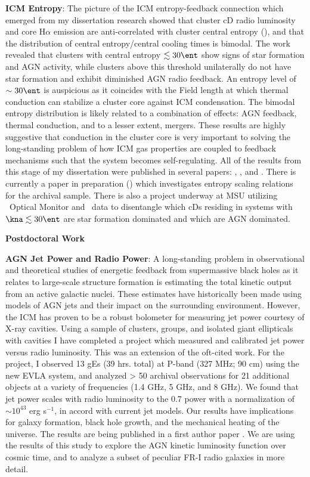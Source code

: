 \documentclass[12pt]{article}
\begin{document}
{\bfseries{ICM Entropy}}: The picture of the ICM entropy-feedback
connection which emerged from my dissertation research showed that
cluster cD radio luminosity and core H$\alpha$ emission are
anti-correlated with cluster central entropy (\kna), and that the
distribution of central entropy/central cooling times is bimodal. The
work revealed that clusters with central entropy $\lesssim 30 \ent$
show signs of star formation and AGN activity, while clusters above
this threshold unilaterally do not have star formation and exhibit
diminished AGN radio feedback. An entropy level of $\sim 30 \ent$ is
auspicious as it coincides with the Field length at which thermal
conduction can stabilize a cluster core against ICM condensation. The
bimodal entropy distribution is likely related to a combination of
effects: AGN feedback, thermal conduction, and to a lesser extent,
mergers. These results are highly suggestive that conduction in the
cluster core is very important to solving the long-standing problem of
how ICM gas properties are coupled to feedback mechanisms such that
the system becomes self-regulating. All of the results from this stage
of my dissertation were published in several papers: \cite{accept},
\cite{haradent}, and \cite{conduction}. There is currently a paper in
preparation (\cite{entscale}) which investigates entropy scaling
relations for the archival sample. There is also a project underway at
MSU utilizing \xmm\ Optical Monitor and \spitzer\ data to disentangle
which cDs residing in systems with $\kna \lesssim 30 \ent$ are star
formation dominated and which are AGN dominated.

{\bfseries{Postdoctoral Work}}

{\bfseries{AGN Jet Power and Radio Power}}: A long-standing problem in
observational and theoretical studies of energetic feedback from
supermassive black holes as it relates to large-scale structure
formation is estimating the total kinetic output from an active
galactic nuclei. These estimates have historically been made using
models of AGN jets and their impact on the surrounding
environment. However, the ICM has proven to be a robust bolometer for
measuring jet power courtesy of X-ray cavities. Using a sample of
clusters, groups, and isolated giant ellipticals with cavities I have
completed a project which measured and calibrated jet power versus
radio luminosity. This was an extension of the oft-cited
\cite{birzan04, birzan08} work. For the project, I observed 13 gEs (39
hrs. total) at P-band (327 MHz; 90 cm) using the new EVLA system, and
analyzed > 50 archival observations for 21 additional objects at a
variety of frequencies (1.4 GHz, 5 GHz, and 8 GHz). We found that jet
power scales with radio luminosity to the 0.7 power with a
normalization of $\sim 10^{43}$ erg s$^{-1}$, in accord with current
jet models. Our results have implications for galaxy formation, black
hole growth, and the mechanical heating of the universe. The results
are being published in a first author paper \cite{pjet}. We are using
the results of this study to explore the AGN kinetic luminosity
function over cosmic time, and to analyze a subset of peculiar FR-I
radio galaxies in more detail.
\end{document}
